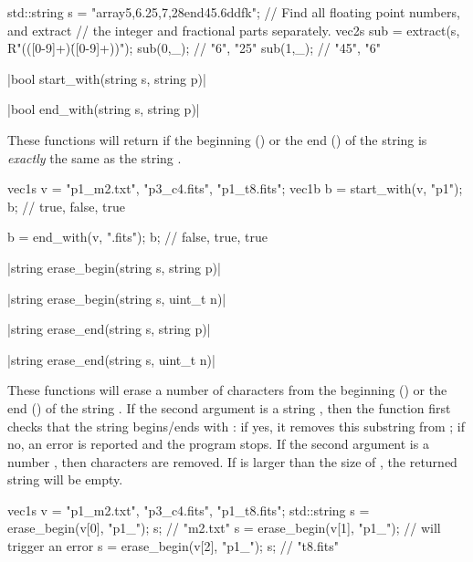 {\begin{example}
\begin{cppcode}
std::string s = "array{5,6.25,7,28}end45.6ddfk";
// Find all floating point numbers, and extract
// the integer and fractional parts separately.
vec2s sub = extract(s, R"(([0-9]+)\.([0-9]+))");
sub(0,_); // {"6", "25"}
sub(1,_); // {"45", "6"}
\end{cppcode}
\end{example}

\item \vectorfunc \cppinline|bool start_with(string s, string p)| 

\vectorfunc \cppinline|bool end_with(string s, string p)| 

These functions will return \cpptrue if the beginning () or the end () of the string  is \emph{exactly} the same as the string .

\begin{example}
\begin{cppcode}
vec1s v = {"p1_m2.txt", "p3_c4.fits", "p1_t8.fits"};
vec1b b = start_with(v, "p1");
b; // {true, false, true}

b = end_with(v, ".fits");
b; // {false, true, true}
\end{cppcode}
\end{example}

\item \vectorfunc \cppinline|string erase_begin(string s, string p)| 

\vectorfunc \cppinline|string erase_begin(string s, uint_t n)|

\vectorfunc \cppinline|string erase_end(string s, string p)| 

\vectorfunc \cppinline|string erase_end(string s, uint_t n)|

These functions will erase a number of characters from the beginning () or the end () of the string . If the second argument is a string , then the function first checks that the string begins/ends with : if yes, it removes this substring from ; if no, an error is reported and the program stops. If the second argument is a number , then  characters are removed. If  is larger than the size of , the returned string will be empty.

\begin{example}
\begin{cppcode}
vec1s v = {"p1_m2.txt", "p3_c4.fits", "p1_t8.fits"};
std::string s = erase_begin(v[0], "p1_");
s; // "m2.txt"
s = erase_begin(v[1], "p1_");
// will trigger an error
s = erase_begin(v[2], "p1_");
s; // "t8.fits"


\end{cppcode}
\end{example}}
